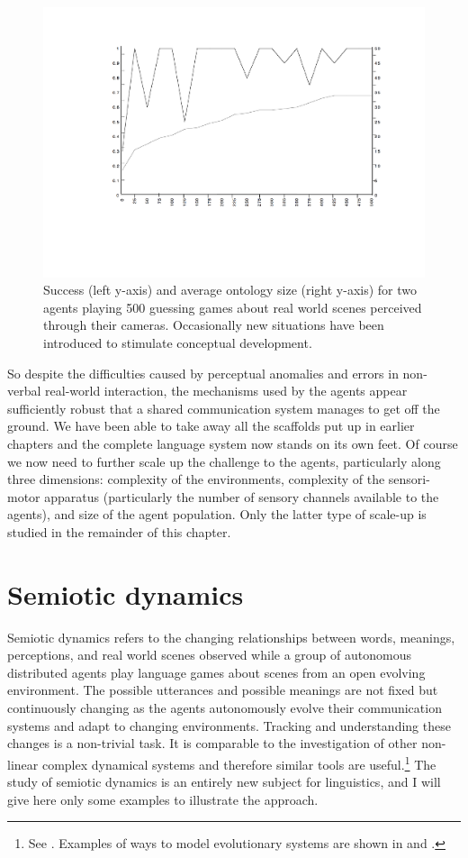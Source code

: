 \begin{figure}[htbp]
  \centerline{\includegraphics[width=.70\textwidth]{chap7/figs/psucc500}}
\caption{\label{psuccess1} Success 
(left y-axis) and average ontology size
(right y-axis) for two agents playing 500
guessing games about real world scenes perceived
through their cameras. Occasionally new situations
have been introduced to stimulate conceptual development.} 
\end{figure}

So despite the difficulties caused by perceptual anomalies
and errors in non-verbal real-world interaction, the 
mechanisms used by the agents appear sufficiently 
robust that a shared communication system manages to get 
off the ground. We have been able to 
take away all the scaffolds put up in earlier
chapters and the complete language system now stands on its own
feet. Of course we now need to further scale up the 
challenge to the agents, particularly along three
dimensions: complexity of the environments, complexity 
of the sensori-motor apparatus (particularly the number of
sensory channels available to the agents), and
size of the agent population. Only the latter type of 
scale-up is studied in the remainder of this chapter. 

\section{Semiotic dynamics} 

Semiotic dynamics refers to the changing relationships
between words, meanings, perceptions,
and real world scenes observed while a group of
autonomous distributed agents play language games
about scenes from an open evolving environment. 
The possible utterances and
possible meanings are not fixed but continuously
changing as the agents autonomously evolve their
communication systems and adapt to changing
environments. Tracking and understanding these
changes is a non-trivial task. It is comparable to 
the investigation of other non-linear complex dynamical
systems and therefore similar tools are useful.\footnote{
See \cite{Badii:1997}. 
Examples of ways to model evolutionary systems are shown in 
\cite{Kauffman:1993} and \cite{Maynard:1989}.}
The study of semiotic dynamics is an entirely new subject
for linguistics, and I will give here only some
examples to illustrate the approach. 

